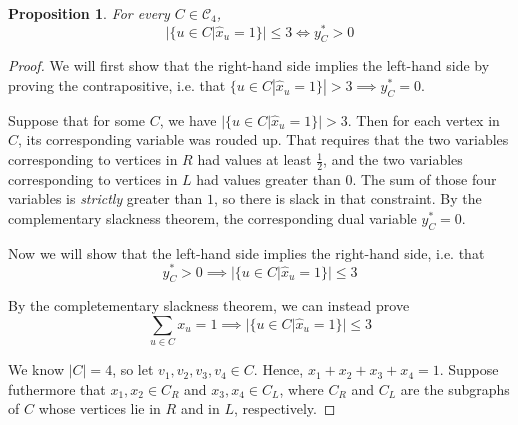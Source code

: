 \documentclass[letterpaper,11pt]{article}
\newtheorem{proposition}{Proposition}
\begin{document}
\begin{enumerate}
\begin{enumerate}
                \begin{proposition}
                    For every $C \in \mathcal{C}_4$,
                    $$
                    |\{u \in C | \hat x_u = 1\}| \leq 3 \iff y_C^* > 0
                    $$
                \end{proposition}

                \begin{proof}
                    We will first show that the right-hand side implies the
                    left-hand side by proving the contrapositive, i.e. that
                    $\{u \in C | \hat x_u = 1\}| > 3 \implies y_C^* = 0$.

                    Suppose that for some $C$, we have
                    $|\{u \in C | \hat x_u = 1\}| > 3$.
                    Then for each vertex in $C$, its corresponding variable was
                    rouded up. That requires that the two variables
                    corresponding to vertices in $R$ had values at least
                    $\frac{1}{2}$, and the two variables corresponding to
                    vertices in $L$ had values greater than $0$. The sum of
                    those four variables is \emph{strictly} greater than $1$,
                    so there is slack in that constraint. By the complementary
                    slackness theorem, the corresponding dual variable
                    $y_C^* = 0$.

                    Now we will show that the left-hand side implies the
                    right-hand side, i.e. that
                    \begin{equation*}
                        y_C^* > 0 \implies |\{u \in C | \hat x_u = 1\}| \leq 3
                    \end{equation*}

                    By the completementary slackness theorem, we can instead
                    prove
                    \begin{equation*}
                        \sum_{u \in C} x_u = 1
                        \implies
                        |\{u \in C | \hat x_u = 1\}| \leq 3
                    \end{equation*}

                    We know $|C| = 4$, so let $v_1, v_2, v_3, v_4 \in C$. Hence,
                    $x_1 + x_2 + x_3 + x_4 = 1$. Suppose futhermore that
                    $x_1, x_2 \in C_R$ and $x_3, x_4 \in C_L$, where $C_R$ and
                    $C_L$ are the subgraphs of $C$ whose vertices lie in $R$
                    and in $L$, respectively.


\end{proof}
\end{enumerate}
\end{enumerate}
\end{document}
